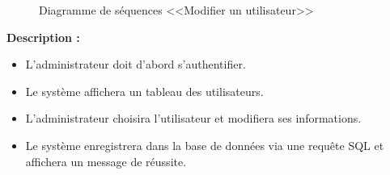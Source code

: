 \documentclass[12pt]{report}
\begin{document}
\begin{figure}[h]
\centering
    \centerline{}
    \caption{Diagramme de séquences <<Modifier un utilisateur>>}
\end{figure}

\vspace{0.3in}

\textbf{Description :}

\begin{itemize}
    \item L'administrateur doit d'abord s'authentifier.
    \item Le système affichera un tableau des utilisateurs.
    \item L'administrateur choisira l'utilisateur et modifiera ses informations.
    \item Le système enregistrera dans la base de données via une requête SQL et affichera un message de réussite.
\end{itemize}

\newpage
\end{document}

